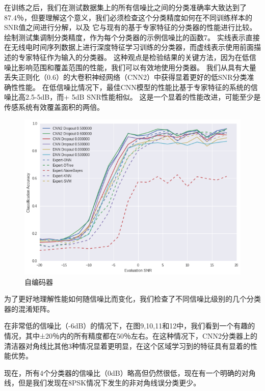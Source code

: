 在训练之后，我们在测试数据集上的所有信噪比之间的分类准确率大致达到了87.4％，但要理解这个意义，我们必须检查这个分类精度如何在不同训练样本的SNR值之间进行分解，以及 它与现有的基于专家特征的分类器的性能进行比较。绘制测试集调制分类精度，作为每个分类器的示例信噪比的函数7。 实线表示直接在无线电时间序列数据上进行深度特征学习训练的分类器，而虚线表示使用前面描述的专家特征作为输入的分类器。 这种观点是检验结果的关键方法，因为在低信噪比影响范围和覆盖范围的性能，我们可以有效地使用分类器。 我们从具有大量丢失正则化（0.6）的大卷积神经网络（CNN2）中获得显着更好的低SNR分类准确性性能。 在低信噪比情况下，最佳CNN模型的性能比基于专家特征的系统的信噪比高2.5-5dB，而+ 5dB SNR性能相似。 这是一个显着的性能改进，可能至少是传感系统有效覆盖面积的两倍。\par

\begin{figure}[!h]
	\centering
	\includegraphics[scale=0.3]{figures/chapter_3/result}
	\caption{自编码器}	\label{fig_3_2}
\end{figure}

为了更好地理解性能如何随信噪比而变化，我们检查了不同信噪比级别的几个分类器的混淆矩阵。\par

在非常低的信噪比（-6dB）的情况下，在图9,10,11和12中，我们看到一个有趣的情况，其中±20％内的所有精度都在50％左右。在这种情况下，CNN2分类器上的清洁器对角线比其他3种情况显着更明显，在这个区域学习到的特征具有显着的性能优势。\par

现在，所有4个分类器的信噪比（0dB）略高但仍然很低，现在有一个明确的对角线，但是我们发现在8PSK情况下发生的非对角线误分类更少。\par

